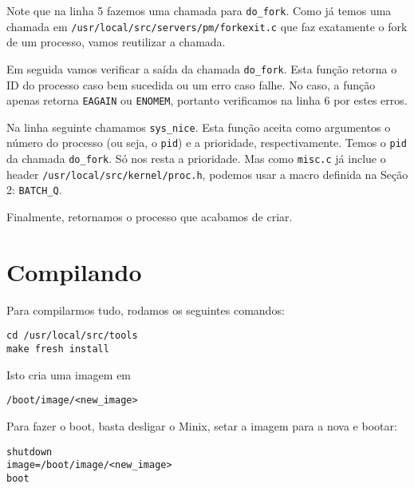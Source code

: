 \documentclass{amsart}
\theoremstyle{plain}
\newcommand{\code}[1]{\lstinline[mathescape=true]{#1}}
\begin{document}
Note que na linha 5 fazemos uma chamada para \code{do_fork}. Como já temos uma chamada em
\code{/usr/local/src/servers/pm/forkexit.c} que faz exatamente o fork de um processo, vamos
reutilizar a chamada.

Em seguida vamos verificar a saída da chamada \code{do_fork}. Esta função retorna o ID do processo
caso bem sucedida ou um erro caso falhe. No caso, a função apenas retorna \code{EAGAIN} ou
\code{ENOMEM}, portanto verificamos na linha 6 por estes erros.

Na linha seguinte chamamos \code{sys_nice}. Esta função aceita como argumentos o número do processo
(ou seja, o \code{pid}) e a prioridade, respectivamente. Temos o \code{pid} da chamada
\code{do_fork}. Só nos resta a prioridade. Mas como \code{misc.c} já inclue o header
\code{/usr/local/src/kernel/proc.h}, podemos usar a macro definida na Seção 2: \code{BATCH_Q}.

Finalmente, retornamos o processo que acabamos de criar.

\section{Compilando}

Para compilarmos tudo, rodamos os seguintes comandos:

\begin{lstlisting}[frame=leftline,mathescape=true,style=nonumbers]
cd /usr/local/src/tools
make fresh install
\end{lstlisting}

Isto cria uma imagem em 

\begin{lstlisting}[frame=leftline,mathescape=true,style=nonumbers]
/boot/image/<new_image>
\end{lstlisting}

Para fazer o boot, basta desligar o Minix, setar a imagem para a nova e bootar:
\begin{lstlisting}[frame=leftline,mathescape=true,style=nonumbers]
shutdown
image=/boot/image/<new_image>
boot
\end{lstlisting}
\end{document}
